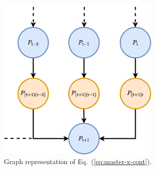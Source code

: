 \begin{figure}[h]
\centering
\includegraphics[width=8cm]{images/master-eq-graph.drawio.png}
\caption{Graph representation of Eq.~(\ref{eq:master-x-cont}).}
\label{fig:master-eqn}
\end{figure} 

